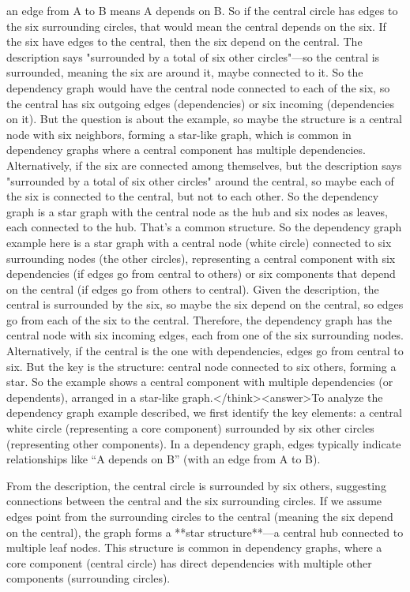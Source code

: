 an edge from A to B means A depends on B. So if the central circle has edges to the six surrounding circles, that would mean the central depends on the six. If the six have edges to the central, then the six depend on the central. The description says "surrounded by a total of six other circles"—so the central is surrounded, meaning the six are around it, maybe connected to it. So the dependency graph would have the central node connected to each of the six, so the central has six outgoing edges (dependencies) or six incoming (dependencies on it). But the question is about the example, so maybe the structure is a central node with six neighbors, forming a star-like graph, which is common in dependency graphs where a central component has multiple dependencies. Alternatively, if the six are connected among themselves, but the description says "surrounded by a total of six other circles" around the central, so maybe each of the six is connected to the central, but not to each other. So the dependency graph is a star graph with the central node as the hub and six nodes as leaves, each connected to the hub. That's a common structure. So the dependency graph example here is a star graph with a central node (white circle) connected to six surrounding nodes (the other circles), representing a central component with six dependencies (if edges go from central to others) or six components that depend on the central (if edges go from others to central). Given the description, the central is surrounded by the six, so maybe the six depend on the central, so edges go from each of the six to the central. Therefore, the dependency graph has the central node with six incoming edges, each from one of the six surrounding nodes. Alternatively, if the central is the one with dependencies, edges go from central to six. But the key is the structure: central node connected to six others, forming a star. So the example shows a central component with multiple dependencies (or dependents), arranged in a star-like graph.</think><answer>To analyze the dependency graph example described, we first identify the key elements: a central white circle (representing a core component) surrounded by six other circles (representing other components). In a dependency graph, edges typically indicate relationships like “A depends on B” (with an edge from A to B).  

From the description, the central circle is surrounded by six others, suggesting connections between the central and the six surrounding circles. If we assume edges point from the surrounding circles to the central (meaning the six depend on the central), the graph forms a **star structure**—a central hub connected to multiple leaf nodes. This structure is common in dependency graphs, where a core component (central circle) has direct dependencies with multiple other components (surrounding circles).  

